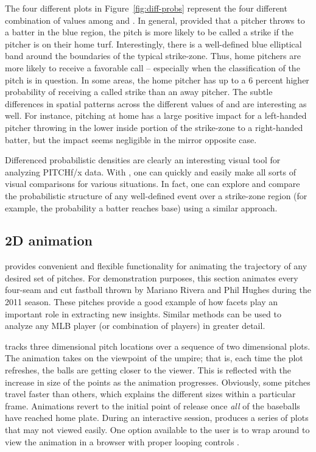 \begin{article}
The four different plots in Figure~\ref{fig:diff-probs} represent
the four different combination of values among  and
. In general, provided that a pitcher throws to a batter
in the blue region, the pitch is more likely to be called a strike
if the pitcher is on their home turf. Interestingly, there is a well-defined
blue elliptical band around the boundaries of the typical strike-zone.
Thus, home pitchers are more likely to receive a favorable call --
especially when the classification of the pitch is in question. In
some areas, the home pitcher has up to a 6 percent higher probability
of receiving a called strike than an away pitcher. The subtle differences
in spatial patterns across the different values of 
and  are interesting as well. For instance, pitching
at home has a large positive impact for a left-handed pitcher throwing
in the lower inside portion of the strike-zone to a right-handed batter,
but the impact seems negligible in the mirror opposite case.

Differenced probabilistic densities are clearly an interesting visual
tool for analyzing PITCHf/x data. With , one can quickly
and easily make all sorts of visual comparisons for various situations.
In fact, one can explore and compare the probabilistic structure of
any well-defined event over a strike-zone region (for example, the
probability a batter reaches base) using a similar approach. 


\subsection{2D animation}

 provides convenient and flexible functionality for
animating the trajectory of any desired set of pitches. For demonstration
purposes, this section animates every four-seam and cut fastball thrown
by Mariano Rivera and Phil Hughes during the 2011 season. These pitches
provide a good example of how facets play an important role in extracting
new insights. Similar methods can be used to analyze any MLB player
(or combination of players) in greater detail.

 tracks three dimensional pitch locations over a
sequence of two dimensional plots. The animation takes on the viewpoint
of the umpire; that is, each time the plot refreshes, the balls are
getting closer to the viewer. This is reflected with the increase
in size of the points as the animation progresses. Obviously, some
pitches travel faster than others, which explains the different sizes
within a particular frame. Animations revert to the initial point
of release once \emph{all} of the baseballs have reached home plate.
During an interactive session,  produces a series
of plots that may not viewed easily. One option available to the user
is to wrap  around  to
view the animation in a browser with proper looping controls \citep{animation}.


\end{article}
